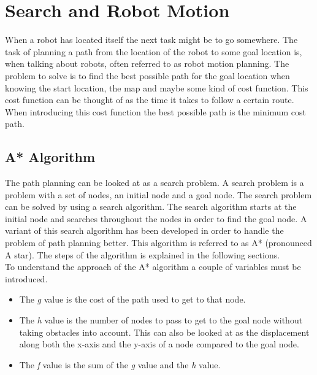 
\section{Search and Robot Motion} %
\label{sec:search_and_robot_motion}

When a robot has located itself the next task might be to go somewhere. The task of planning a path from the location of the robot to some goal location is, when talking about robots, often referred to as robot motion planning. The problem to solve is to find the best possible path for the goal location when knowing the start location, the map and maybe some kind of cost function. This cost function can be thought of as the time it takes to follow a certain route. When introducing this cost function the best possible path is the minimum cost path. \\

\subsection{A* Algorithm} %
\label{sub:a_algorithm}

The path planning can be looked at as a search problem. A search problem is a problem with a set of nodes, an initial node and a goal node. The search problem can be solved by using a search algorithm. The search algorithm starts at the initial node and searches throughout the nodes in order to find the goal node. A variant of this search algorithm has been developed in order to handle the problem of path planning better. This algorithm is referred to as A* (pronounced A star). The steps of the algorithm is explained in the following sections. \\

To understand the approach of the A* algorithm a couple of variables must be introduced. \\

\begin{itemize}
	\item The \emph{g} value is the cost of the path used to get to that node.

	\item The \emph{h} value is the number of nodes to pass to get to the goal node without taking obstacles into account. This can also be looked at as the displacement along both the x-axis and the y-axis of a node compared to the goal node.

	\item The \emph{f} value is the sum of the \emph{g} value and the \emph{h} value.\\
\end{itemize}

